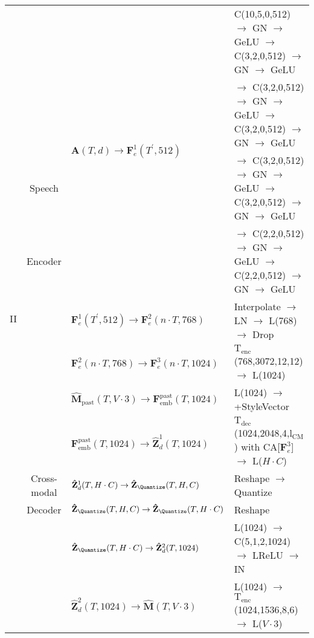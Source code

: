 \begin{table*}[!t]
{{{\begin{tabular}{c|c|l|l}
  \hline
  \multirow{12}{*}{II}& & \multirow{4}{*}{$\mathbf{A}(T, d) \rightarrow \mathbf{F}_e^1(T^\prime, 512)$} &    C(10,5,0,512) $\rightarrow$ GN $\rightarrow$ GeLU $\rightarrow$ C(3,2,0,512) $\rightarrow$ GN $\rightarrow$ GeLU \\
  &&&  $\rightarrow$ C(3,2,0,512) $\rightarrow$ GN $\rightarrow$ GeLU $\rightarrow$ C(3,2,0,512) $\rightarrow$ GN $\rightarrow$ GeLU\\
  &Speech&&  $\rightarrow$ C(3,2,0,512) $\rightarrow$ GN $\rightarrow$ GeLU $\rightarrow$ C(3,2,0,512) $\rightarrow$ GN $\rightarrow$ GeLU\\
  &Encoder&&  $\rightarrow$ C(2,2,0,512) $\rightarrow$ GN $\rightarrow$ GeLU $\rightarrow$ C(2,2,0,512) $\rightarrow$ GN $\rightarrow$ GeLU\\
  &&   $\mathbf{F}_e^1(T^\prime, 512) \rightarrow \mathbf{F}_e^2(n \cdot T, 768)$  & Interpolate $\rightarrow$ LN $\rightarrow$ L(768) $\rightarrow$ Drop \\
  && $\mathbf{F}_e^2(n \cdot T, 768) \rightarrow \mathbf{F}_e^3(n \cdot T, 1024)$  &  $\text{T}_\text{enc}$(768,3072,12,12) $\rightarrow$ L(1024) \\
  \cline{2-4}
  &&  $\mathbf{\hat{M}}_\text{past}(T,V \cdot 3) \rightarrow \mathbf{F}_\text{emb}^\text{past}(T, 1024)$ & L(1024) $\rightarrow$ +StyleVector \\
  && $\mathbf{F}_\text{emb}^\text{past}(T, 1024) \rightarrow \mathbf{\hat{Z}}_d^1(T, 1024)$ &  $\text{T}_\text{dec}$(1024,2048,4,$\text{l}_\text{CM}$) with CA[$\mathbf{F}_e^3$] $\rightarrow$ L($H \cdot C$) \\
  &Cross-modal& $\mathbf{\hat{Z}}_d^1(T, H \cdot C) \rightarrow \mathbf{\hat{Z}}_\Quantize(T,H,C)$ &  Reshape $\rightarrow$ Quantize  \\
  & Decoder  & $\mathbf{\hat{Z}}_\Quantize(T,H,C) \rightarrow \mathbf{\hat{Z}}_\Quantize(T,H \cdot C)$     & Reshape\\
  &&$\mathbf{\hat{Z}}_\Quantize(T,H \cdot C) \rightarrow \mathbf{\hat{Z}}^2_d(T,1024)$ & L(1024) $\rightarrow$ C(5,1,2,1024) $\rightarrow$ LReLU $\rightarrow$ IN\\
  && $\mathbf{\hat{Z}}^2_d(T,1024) \rightarrow \mathbf{\hat{M}}(T,V \cdot 3)$& L(1024) $\rightarrow$ $\text{T}_\text{enc}$(1024,1536,8,6) $\rightarrow$ L($V \cdot 3$)\\
  \bottomrule[0.8pt]
  \end{tabular} 
    }
    }
  }
  \label{tab:network_arch}
\end{table*}

